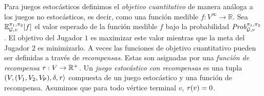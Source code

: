 
Para juegos estocásticos definimos el \emph{objetivo cuantitativo} de manera análoga a los juegos no estocásticos, es decir, como una función medible $f: V^{\infty} \to \mathbb{R}$.   Sea $\mathbb{E}^{\pi_{1}, \pi_{2}}_{\mathcal{G},v}[f]$ el valor esperado de la función medible $f$ bajo la probabilidad $\mathit{Prob}^{\pi_{1}, \pi_{2}}_{\mathcal{G},v}$. El objetivo del Jugador $1$ es maximizar este valor mientras que la meta del Jugador $2$ es minimizarlo.  A veces las funciones de objetivo cuantitativo pueden ser definidas a través de \emph{recompensas}. Estas son asignadas por una \emph{función de recompensa} $\mathit{r}:V \to \mathbb{R}^+$. Un \emph{juego estocástico con recompensas} es una tupla $(V, (V_1, V_2, V_{\mathsf{P}}), \delta, \mathit{r} \rangle$ compuesta de un juego estocástico y una función de recompensa. Asumimos que para todo vértice terminal $v$,  $\mathit{r}(v) = 0$.

